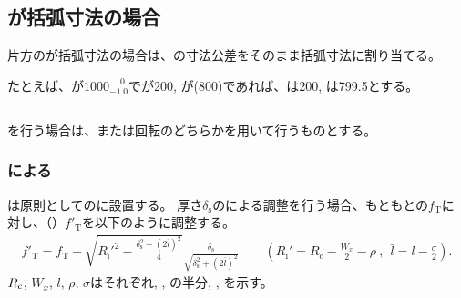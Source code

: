 \subsection{\AlocationLength が括弧寸法の場合}
片方の\AlocationLength が括弧寸法の場合は、\WorkTotalLength の寸法公差をそのまま括弧寸法に割り当てる。
\begin{hosoku}
たとえば、\WorkTotalLength が$1000^{\phantom +0}_{-1.0}$で\TopAlocationLength が200, \BottomAlocationLength が(800)であれば、\TopAlocationLength は200, \BottomAlocationLength は799.5とする。
\end{hosoku}


\subsection{\AlocationAdjustment}
\AlocationAdjustment を行う場合は、\Spacer または\nameTable 回転のどちらかを用いて行うものとする。

\subsubsection{\indexSpacerAlocationAdjustment\nameSpacer による\nameAlocationAdjustment}
\Spacer は原則として\Jig の\TopSideReceiverPlate に設置する。
厚さ$\delta_\mathrm s$の\indexSpacerAlocationAdjustment\nameSpacer による調整を行う場合、もともとの\TopAlocationLength$f_\mathrm T$に対し、\nameTopAlocationLength（\TopReAlocationLength）$f'_\mathrm T$を以下のように調整する。
\begin{align*}
  f'_\mathrm T
  = f_\mathrm T
    +\sqrt{R_\mathrm i'^2-\frac{\delta_\mathrm s^2+(2\bar l)^2}4}\frac{\delta_\mathrm s}{\sqrt{\delta_\mathrm s^2+(2\bar l)^2}}\qquad
    \left(R_\mathrm i' = R_\mathrm c-\frac{W_x}2-\rho~,~~\bar l = l-\frac\sigma2\right).
\end{align*}
$R_\textrm c$, $W_x$, $l$, $\rho$, $\sigma$はそれぞれ\CenterCurvatureRadius, \ACOD, \JigWidth の半分, \ReceiverPlateRadius, \ReceiverPlateWidth を示す。

